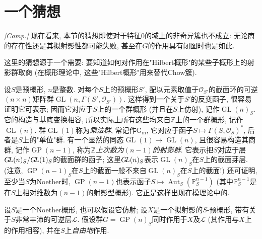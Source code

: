 \chapter{一个猜想}\thispagestyle{fancy}\label{fga3.iii-8}
\begin{remark}{}\label{fga3.iii-8-remark-i}\skipsinglepar
\par{}\emph{[Comp.]} 现在看来, 本节的猜想即使对于特征\(0\)的域上的非奇异簇也不成立: 无论商的存在性还是其拟射影性都可能失败, 甚至在\(G\)的作用具有闭图时也是如此.
\end{remark}
\par{}这里的猜想源于一个需要: 要知道如何对作用在"Hilbert概形"的某些子概形上的射影群取商 (在概形理论中, 这些"Hilbert概形"用来替代Chow簇).
\par{}设\(S\)是预概形, \(n\)是整数. 对每个\(S\)上的预概形\(S'\), 配以元素取值于\(\mathcal {O}_{S'}\)的截面环的可逆\((n\times  n)\)矩阵群\(\operatorname {GL}(n,\Gamma (S',\mathcal {O}_{S'}))\). 这样得到一个关于\(S'\)的反变函子, 很容易证明它可表示; 因而它对应于\(S\)上的一个群概形 (并且在\(S\)上仿射), 记作\(\operatorname {GL}(n)_S\). 它的构造与基底变换相容, 所以实际上所有这些均来自\(\mathbb {Z}\)上的一个群概形, 记作\(\operatorname {GL}(n)\). 群\(\operatorname {GL}(1)\)称为\emph{乘法群}, 常记作\(\operatorname {G_m}\), 它对应于函子\(S\mapsto \Gamma (S,\mathcal {O}_S)^*\), 后者是\(S\)上的"单位"群. 有一个显然的同态\(\operatorname {GL}(1)\to \operatorname {GL}(n)\), 且很容易构造其商群, 记作\(\operatorname {GP}(n-1)\), 称为\emph{\(\mathbb {Z}\)上次数为\((n-1)\)的射影群}. 它表示把\(S\)对应于层\(\operatorname {\mathscr {G}\kern  -2pt\mathscr {L}}(n)_S/\operatorname {\mathscr {G}\kern  -2pt\mathscr {L}}(1)_S\)的截面群的函子; 这里\(\operatorname {\mathscr {G}\kern  -2pt\mathscr {L}}(n)_S\)表示\(\operatorname {GL}(n)_S\)在\(S\)上的截面芽层. (注意, \(\operatorname {GP}(n-1)_S\)在\(S\)上的截面一般不来自\(\operatorname {GL}(n)_S\)在\(S\)上的截面!) 还可证明, 至少当\(S\)为Noether时, \(\operatorname {GP}(n-1)\)也表示函子\(S\mapsto \operatorname {Aut}_S(\mathbb {P}_S^{n-1})\) (其中\(\mathbb {P}_S^{n-1}\)是在\(S\)上相对维数为\((n-1)\)的射影型概形). 它正是这样出现在模理论中的.
\par{}设\(S\)是一个Noether概形, 也可以假设它仿射; 设\(X\)是一个拟射影的\(S\)-预概形, 带有关于\(S\)非常丰沛的可逆层\(\mathscr {L}\). 假设群\(G=\operatorname {GP}(n)_S\)同时作用于\(X\)及\(\mathscr {L}\) (其作用与\(X\)上的作用相容), 并在\(S\)上\emph{自由地}作用.
